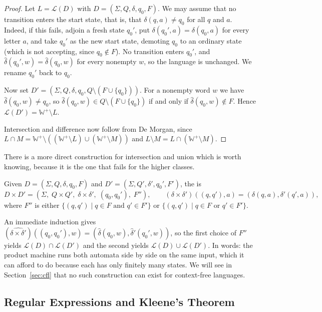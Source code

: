 \documentclass[a4paper]{scrartcl}
\newcommand{\WW}{\mathbb{W}}
\newcommand{\lang}{\mathcal{L}}
\begin{document}
\begin{proof}
	Let $L = \lang(D)$ with $D = (\Sigma, Q, \delta, q_0, F)$. We may assume that no transition enters the start state, that is, that $\delta(q,a) \neq q_0$ for all $q$ and $a$. Indeed, if this fails, adjoin a fresh state $q_0'$, put $\delta(q_0',a) = \delta(q_0,a)$ for every letter $a$, and take $q_0'$ as the new start state, demoting $q_0$ to an ordinary state (which is not accepting, since $q_0 \notin F$). No transition enters $q_0'$, and $\hat\delta(q_0',w) = \hat\delta(q_0,w)$ for every nonempty $w$, so the language is unchanged. We rename $q_0'$ back to $q_0$.

	Now set $D' = (\Sigma, Q, \delta, q_0, Q \setminus (F \cup \{q_0\}))$. For a nonempty word $w$ we have $\hat\delta(q_0,w) \neq q_0$, so $\hat\delta(q_0,w) \in Q \setminus (F \cup \{q_0\})$ if and only if $\hat\delta(q_0,w) \notin F$. Hence $\lang(D') = \WW^+ \setminus L$.

	Intersection and difference now follow from De Morgan, since $L \cap M = \WW^+ \setminus ((\WW^+ \setminus L) \cup (\WW^+ \setminus M))$ and $L \setminus M = L \cap (\WW^+ \setminus M)$.
\end{proof}

There is a more direct construction for intersection and union which is worth knowing, because it is the one that fails for the higher classes.

\begin{definition}
	Given $D = (\Sigma, Q, \delta, q_0, F)$ and $D' = (\Sigma, Q', \delta', q_0', F')$, the  is
	$$D \times D' = (\Sigma,\; Q \times Q',\; \delta \times \delta',\; (q_0,q_0'),\; F''), \qquad (\delta\times\delta')((q,q'),a) = (\delta(q,a), \delta'(q',a)),$$
	where $F''$ is either $\{(q,q') \mid q \in F \text{ and } q' \in F'\}$ or $\{(q,q') \mid q \in F \text{ or } q' \in F'\}$.
\end{definition}

An immediate induction gives $(\widehat{\delta\times\delta'})((q_0,q_0'),w) = (\hat\delta(q_0,w), \hat\delta'(q_0',w))$, so the first choice of $F''$ yields $\lang(D)\cap\lang(D')$ and the second yields $\lang(D)\cup\lang(D')$. In words: the product machine runs both automata side by side on the same input, which it can afford to do because each has only finitely many states. We will see in Section~\ref{sec:cfl} that no such construction can exist for context-free languages.

\subsection{Regular Expressions and Kleene's Theorem}
\end{document}
